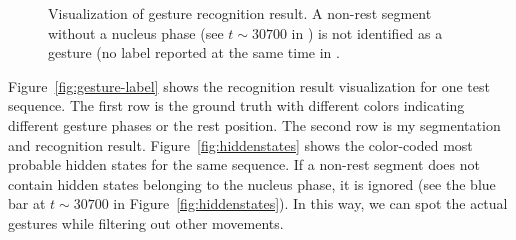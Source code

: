 \begin{figure}[!tbh]
\centering
{}
\caption{Visualization of gesture recognition result. A non-rest segment
without a nucleus phase (see $t\sim 30700$ in ) is not
identified as a gesture (no label reported at the same time in
.}
\end{figure}

Figure~\ref{fig:gesture-label} shows the recognition result visualization for
one test sequence. The first row is the ground truth with different colors
indicating different gesture phases or the rest position.
The second row is my segmentation and recognition result.
Figure~\ref{fig:hiddenstates} shows the color-coded most probable hidden states
for the same sequence.
If a non-rest segment does not contain hidden states belonging to the nucleus
phase, it is ignored (see the blue bar at $t\sim 30700$ in Figure~\ref{fig:hiddenstates}).
In this way, we can spot the actual gestures while filtering out other movements.

